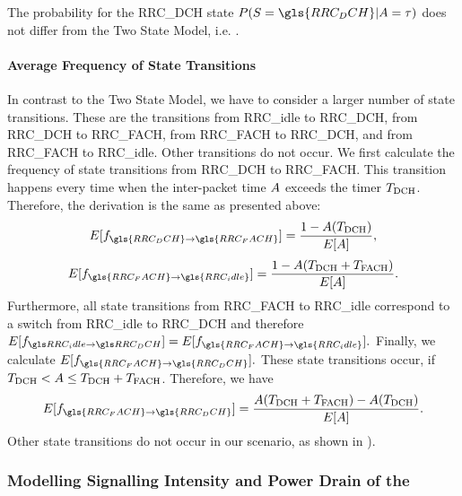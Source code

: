 The probability for the \gls{RRC_DCH} state \(P(\RRCState=\gls{RRC_DCH} \vert \PacketIAT = \ObservationIntervalLength)\) does not differ from the Two State Model, i.e. .

\paragraph*{Average Frequency of State Transitions}

\newcommand{\fStateTransitionsDCHToFACH}{f_{\gls{RRC_DCH}\rightarrow\gls{RRC_FACH}}\xspace}
\newcommand{\fStateTransitionsFACHToIdle}{f_{\gls{RRC_FACH}\rightarrow\gls{RRC_idle}}\xspace}
\newcommand{\fStateTransitionsFACHToDCH}{f_{\gls{RRC_FACH}\rightarrow\gls{RRC_DCH}}\xspace}

In contrast to the Two State Model, we have to consider a larger number of state transitions.
These are the transitions from \gls{RRC_idle} to \gls{RRC_DCH}, from \gls{RRC_DCH} to \gls{RRC_FACH}, from \gls{RRC_FACH} to \gls{RRC_DCH}, and from \gls{RRC_FACH} to \gls{RRC_idle}.
Other transitions do not occur.
We first calculate the frequency of state transitions from \gls{RRC_DCH} to \gls{RRC_FACH}.
This transition happens every time when the inter-packet time \(A\) exceeds the timer \(T_{\text{DCH}}\).
Therefore, the derivation is the same as presented above:
\begin{equation*}
E[\fStateTransitionsDCHToFACH]=\frac{1-\PacketIAT(\TDCH)}{E[\PacketIAT]},
\end{equation*}
\begin{equation*}
E[\fStateTransitionsFACHToIdle]=\frac{1-\PacketIAT(\TDCH+\TFACH)}{E[\PacketIAT]}.
\end{equation*}
Furthermore, all state transitions from \gls{RRC_FACH} to \gls{RRC_idle} correspond to a switch from \gls{RRC_idle} to \gls{RRC_DCH} and therefore
\(E[\fStateTransitionsIdleToDCH]=E[\fStateTransitionsFACHToIdle].\)
Finally, we calculate \(E[\fStateTransitionsFACHToDCH].\)
These state transitions occur, if \(T_{\text{DCH}}<A \leq T_{\text{DCH}}+T_{\text{FACH}}\).
Therefore, we have
\begin{equation*}
E[\fStateTransitionsFACHToDCH]=\frac{\PacketIAT(\TDCH+\TFACH)-\PacketIAT(\TDCH)}{E[\PacketIAT]}.
\end{equation*}
Other state transitions do not occur in our scenario, as shown in ).

\subsubsection*{Modelling Signalling Intensity and Power Drain of the }\label{sec:network:performance_model:analytical_model:metrics}

